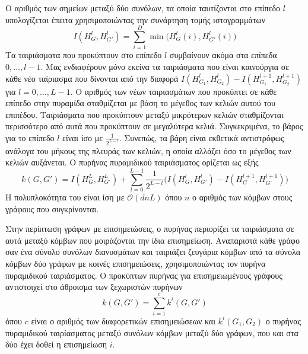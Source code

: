 Ο αριθμός των σημείων μεταξύ δύο συνόλων, τα οποία ταυτίζονται στο επίπεδο $l$ υπολογίζεται έπειτα χρησιμοποιώντας την συνάρτηση τομής ιστογραμμάτων
\begin{equation}
  I(H_G^l,H_{G'}^l) = \sum_{i=1}^D \min\big(H_G^l(i),H_{G'}^l(i)\big)
\end{equation}
Τα ταιριάσματα που προκύπτουν στο επίπεδο $l$ συμβαίνουν ακόμα στα επίπεδα $0, \ldots, l-1$.
Μας ενδιαφέρουν μόνο εκείνα τα ταιριάσματα που είναι καινούργια σε κάθε νέο ταίριασμα που δίνονται από την διαφορά $I(H_{G_1}^l,H_{G_2}^l) - I(H_{G_1}^{l+1},H_{G_2}^{l+1})$ για $l=0,\ldots,L-1$.
Ο αριθμός των νέων ταιριασμάτων που προκύπτει σε κάθε επίπεδο στην πυραμίδα σταθμίζεται με βάση το μέγεθος των κελιών αυτού του επιπέδου.
Ταιριάσματα που προκύπτουν μεταξύ μικρότερων κελιών σταθμίζονται περισσότερο από αυτά που προκύπτουν σε μεγαλύτερα κελιά.
Συγκεκριμένα, το βάρος για το επίπεδο $l$ είναι ίσο με $\frac{1}{2^{L-l}}$.
Συνεπώς, τα βάρη είναι εκθετικά αντιστρόφως ανάλογα του μήκους της πλευράς των κελιών, η οποία αλλάζει όσο το μέγεθος των κελιών αυξάνεται.
Ο πυρήνας πυραμιδικού ταιριάσματος ορίζεται ως εξής
\begin{equation}
  k(G,G') = I(H_G^L,H_{G'}^L) + \sum_{l=0}^{L-1} \frac{1}{2^{L-l}}\big(I(H_G^l,H_{G'}^l) - I(H_G^{l+1},H_{G'}^{l+1})\big)
\end{equation} 
Η πολυπλοκότητα του είναι ίση με $\mathcal{O}(dnL)$ όπου $n$ ο αριθμός των κόμβων στους γράφους που συγκρίνονται.

Στην περίπτωση γράφων με επισημειώσεις, ο πυρήνας περιορίζει τα ταιριάσματα σε αυτά μεταξύ κόμβων που μοιράζονται την ίδια επισημείωση.
Αναπαριστά κάθε γράφο σαν ένα σύνολο συνόλων διανυσμάτων και ταιριάζει ζευγάρια κόμβων από τα σύνολα κόμβων δύο γράφων με κοινές επισημειώσεις, χρησιμοποιώντας τον πυρήνα πυραμιδικού ταιριάσματος.
Ο προκύπτων πυρήνας για επισημειωμένους γράφους αντιστοιχεί στο άθροισμα των ξεχωριστών πυρήνων
\begin{equation}
    k(G, G') = \sum_{i=1}^c k^i(G,G')
\end{equation}
όπου $c$ είναι ο αριθμός των διαφορετικών επισημειώσεων και $k^i(G_1,G_2)$ ο πυρήνας πυραμιδικού ταιρίασματος μεταξύ συνόλων κόμβων μεταξύ δύο γράφων, που και στα δύο έχει δοθεί η επισημείωση $i$.


